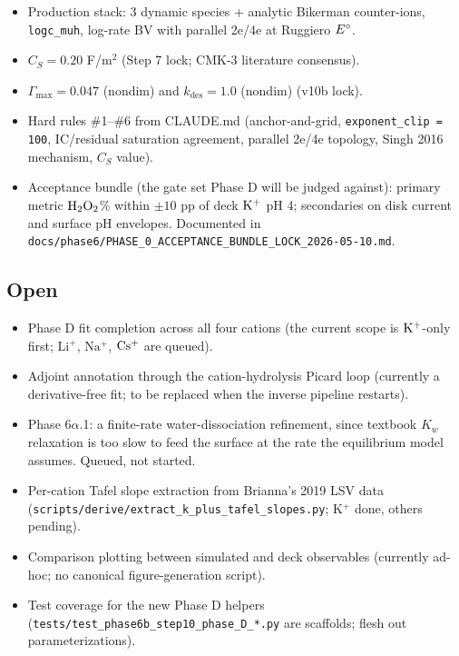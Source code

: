 \documentclass[11pt]{article}
\begin{document}
\begin{itemize}[leftmargin=*]
  \item Production stack: 3 dynamic species + analytic Bikerman
        counter-ions, \texttt{logc\_muh}, log-rate BV with parallel
        2e/4e at Ruggiero $E^{\circ}$.
  \item $C_S = 0.20$ F/m$^2$ (Step 7 lock; CMK-3 literature
        consensus).
  \item $\Gamma_{\max} = 0.047$ (nondim) and
        $k_{\mathrm{des}} = 1.0$ (nondim) (v10b lock).
  \item Hard rules \#1--\#6 from CLAUDE.md (anchor-and-grid,
        \texttt{exponent\_clip = 100}, IC/residual saturation
        agreement, parallel 2e/4e topology, Singh 2016 mechanism,
        $C_S$ value).
  \item Acceptance bundle (the gate set Phase D will be judged
        against): primary metric $\mathrm{H_2O_2}$\% within $\pm 10$ pp of
        deck $\mathrm{K^+}$ pH 4; secondaries on disk current and surface pH
        envelopes. Documented in
        \texttt{docs/phase6/PHASE\_0\_ACCEPTANCE\_BUNDLE\_LOCK\_2026-05-10.md}.
\end{itemize}

\subsection{Open}

\begin{itemize}[leftmargin=*]
  \item Phase D fit completion across all four cations (the current
        scope is $\mathrm{K^+}$-only first; $\mathrm{Li^+}$, $\mathrm{Na^+}$,
        $\mathrm{Cs^+}$ are queued).
  \item Adjoint annotation through the cation-hydrolysis Picard
        loop (currently a derivative-free fit; to be replaced when
        the inverse pipeline restarts).
  \item Phase 6$\alpha$.1: a finite-rate water-dissociation
        refinement, since textbook $K_w$ relaxation is too slow to
        feed the surface at the rate the equilibrium model assumes.
        Queued, not started.
  \item Per-cation Tafel slope extraction from Brianna's 2019 LSV
        data (\texttt{scripts/derive/extract\_k\_plus\_tafel\_slopes.py};
        K$^+$ done, others pending).
  \item Comparison plotting between simulated and deck observables
        (currently ad-hoc; no canonical figure-generation script).
  \item Test coverage for the new Phase D helpers
        (\texttt{tests/test\_phase6b\_step10\_phase\_D\_*.py} are
        scaffolds; flesh out parameterizations).
\end{itemize}
\end{document}
